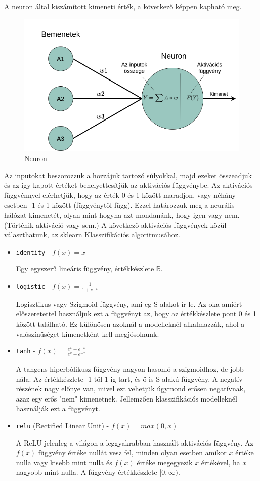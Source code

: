 \noindent A neuron által kiszámított kimeneti érték, a következő képpen kapható meg.
\begin{figure}[h!]
\centering
\includegraphics[scale=0.3]{images/neuron.png}
\caption{Neuron}
\label{fig:neuron}
\end{figure}

Az inputokat beszorozzuk a hozzájuk tartozó súlyokkal, majd ezeket összeadjuk és az így kapott értéket behelyettesítjük az aktivációs függvénybe.
Az aktivációs függvénnyel elérhetjük, hogy az érték 0 és 1 között maradjon, vagy néhány esetben -1 és 1 között (függvénytől függ). Ezzel határozzuk meg a neurális hálózat kimenetét, olyan mint hogyha azt mondanánk, hogy igen vagy nem. (Történik aktiváció vagy sem.) 
A következő aktivációs függvények közül választhatunk, az sklearn Klasszifikációs algoritmusához.
\begin{itemize}
\item \texttt{identity} - $f(x) = x$

Egy egyszerű lineáris függvény, értékkészlete $\mathbb{R}$.
\item \texttt{logistic} - $f(x) = \frac{1}{1+e^{-x}}$

Logisztikus vagy Szigmoid függvény, ami eg S alakot ír le. Az oka amiért előszeretettel használjuk ezt a függvényt az, hogy az értékkészlete pont 0 és 1 között található. Ez különösen azoknál a modelleknél alkalmazzák, ahol a valószínűséget kimenetként kell megjósolnunk.
\item \texttt{tanh} - $f(x) = \frac{e^{x}-e^{-x}}{e^{x}+e^{-x}}$

A tangens hiperbólikusz függvény nagyon hasonló a szigmoidhoz, de jobb nála. Az értékkészlete -1-től 1-ig tart, és ő is S alakú függvény.
A negatív részének nagy előnye van, mivel ezt vehetjük úgymond erősen negatívnak, azaz egy erős "nem" kimenetnek. Jellemzően klasszifikációs modelleknél használják ezt a függvényt.
\item \texttt{relu} (Rectified Linear Unit) - $f(x) = max(0,x)$

A ReLU jelenleg a világon a leggyakrabban használt aktivációs függvény.
Az $f(x)$ függvény értéke nullát vesz fel, minden olyan esetben amikor $x$ értéke nulla vagy kisebb mint nulla és $f(x)$ értéke megegyezik $x$ értékével, ha $x$ nagyobb mint nulla.
A függvény értékkészlete $[0,\infty)$.
\end{itemize}

